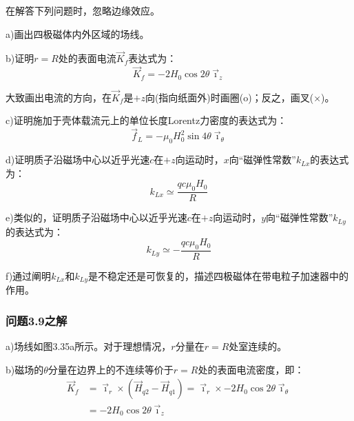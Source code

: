 在解答下列问题时，忽略边缘效应。

a)画出四极磁体内外区域的场线。 

b)证明$r=R$处的表面电流$\vec{K}_f$表达式为：
\begin{equation}
\vec{K}_{f}=-2H_{0}\cos 2\theta\vec{\imath}_{z}%
\end{equation}

大致画出电流的方向，在$\vec{K}_f$是$+z$向(指向纸面外)时画圈(o)；反之，画叉(×)。

c)证明施加于壳体载流元上的单位长度Lorentz力密度的表达式为：
\begin{equation}
\vec{f}_{L}=-\mu_{0}H_{0}^{2}\sin 4\theta\vec{\imath}_{\theta}%
\end{equation}

d)证明质子沿磁场中心以近乎光速$c$在$+z$向运动时，$x$向“磁弹性常数”$k_{Lx}$的表达式为：
\begin{equation}
k_{Lx}\simeq\frac{qc\mu_{0}H_{0}}{R}%
\end{equation}

e)类似的，证明质子沿磁场中心以近乎光速$c$在$+z$向运动时，$y$向“磁弹性常数”$k_{Ly}$的表达式为：
\begin{equation}
k_{Ly}\simeq-\frac{qc\mu_{0}H_{0}}{R}%
\end{equation}

f)通过阐明$k_{Lx}$和$k_{Ly}$是不稳定还是可恢复的，描述四极磁体在带电粒子加速器中的作用。

\subsubsection{问题3.9之解}
a)场线如图3.35a所示。对于理想情况，$r$分量在$r=R$处室连续的。

b)磁场的$\theta$分量在边界上的不连续等价于$r=R$处的表面电流密度，即：
\begin{equation*}
\begin{split}
\vec{K}_{f}&=\vec{\imath}_{r}\times(\vec{H}_{q2}-\vec{H}_{q1})=\vec{\imath}_{r}\times-2H_{0}\cos 2\theta\vec{\imath}_{\theta}\\
&=-2H_{0}\cos 2\theta\vec{\imath}_{z}%
\end{split} \tag{3.146}
\end{equation*}

